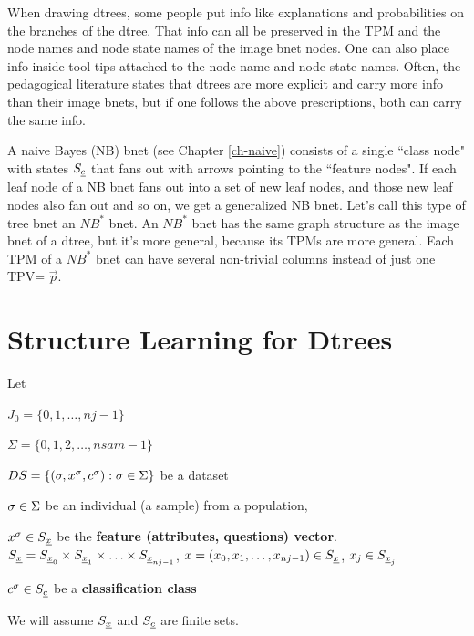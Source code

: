 When drawing dtrees,
some people put
info 
like explanations 
and probabilities on the
branches
of  the dtree.
That
info can all
be preserved
in the TPM
and  the
node names and
 node state names
of the image bnet nodes.
One can also place info
inside tool tips attached to
the node name and node state names.
Often,
the pedagogical literature
states that 
dtrees are more explicit and  
carry
more info than their
image bnets,
but if one 
follows the above
prescriptions,
both can carry
the same info.



A naive Bayes (NB) bnet 
(see Chapter \ref{ch-naive})
consists of a single ``class node"
with states $S_{\underline{c}}$ that fans
out with arrows 
pointing to the
``feature nodes".
If each leaf node
of a NB bnet
fans out into 
a set of new leaf
nodes, and those new
leaf nodes
also
fan out
and so on,
we get a 
generalized NB bnet.
Let's call
this type of tree bnet an $NB^*$ bnet.
An $NB^*$ bnet
has the same graph structure
as the image bnet of a dtree,
but it's more general,
because its 
TPMs are more general. 
Each 
TPM of a $NB^*$ bnet
 can have several non-trivial
columns instead of just one
TPV= $\vec{p}$.


\section{Structure Learning for  Dtrees}\label{sec-dtree-sl}



Let

$J_0=\{0,1, \ldots, nj-1\}$

$\Sigma=\{0,1,2, \ldots,nsam-1\}$

$DS=\{(\sigma, x^\sigma, c^\sigma): \sigma\in \Sigma\}$ be a dataset

$\sigma\in \Sigma$ be an individual (a sample)
from a population, 

$x^\sigma\in S_{\underline{x}}$ be the {\bf
feature (attributes, questions) vector}.
$S_{\underline{x}}= S_{{\underline{x}}_0}\times S_{{\underline{x}}_1}
\times\ldots\times S_{{\underline{x}}_{nj-1}}$,
$x=(x_0, x_1, \ldots, x_{nj-1})\in S_{\underline{x}}$, 
$x_j\in S_{{\underline{x}}_j}$


$c^\sigma\in S_{\underline{c}}$ be a {\bf classification class}

We will
assume $S_{\underline{x}}$ and $S_{\underline{c}}$ are finite sets.

